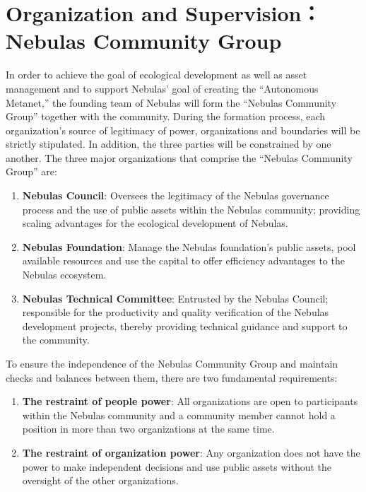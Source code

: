 \section{Organization and Supervision：Nebulas Community Group}

In order to achieve the goal of ecological development as well as asset management and to support Nebulas’ goal of creating the “Autonomous Metanet,” the founding team of Nebulas will form the “Nebulas Community Group” together with the community. During the formation process, each organization’s source of legitimacy of power, organizations and boundaries will be strictly stipulated. In addition, the three parties will be constrained by one another. The three major organizations that comprise the “Nebulas Community Group” are:

\begin{enumerate}
	\item \textbf{Nebulas Council}: Oversees the legitimacy of the Nebulas governance process and the use of public assets within the Nebulas community; providing scaling advantages for the ecological development of Nebulas.
	\item \textbf{Nebulas Foundation}: Manage the Nebulas foundation’s public assets, pool available resources and use the capital to offer efficiency advantages to the Nebulas ecosystem.
	\item \textbf{Nebulas Technical Committee}: Entrusted by the Nebulas Council; responsible for the productivity and quality verification of the Nebulas development projects, thereby providing technical guidance and support to the community.
\end{enumerate}

\vspace{2em}

To ensure the independence of the Nebulas Community Group and maintain checks and balances between them, there are two fundamental requirements:

\begin{enumerate}
	\item \textbf{The restraint of people power}: All organizations are open to participants within the Nebulas community and a community member cannot hold a position in more than two organizations at the same time.
	\item \textbf{The restraint of organization power}: Any organization does not have the power to make independent decisions and use public assets without the oversight of the other organizations.
\end{enumerate}

